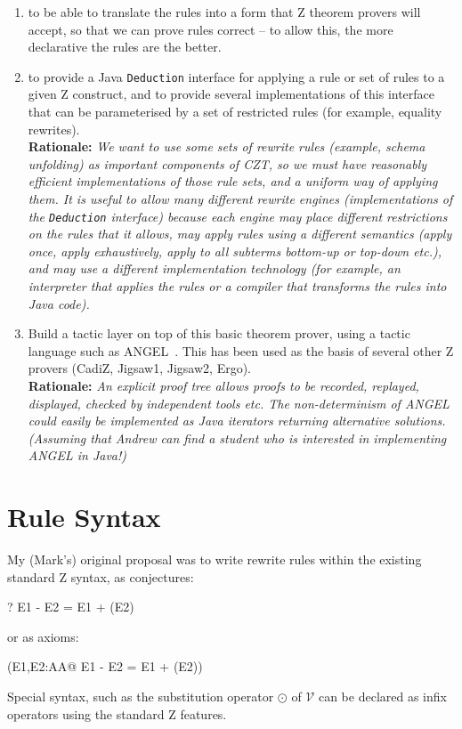 \documentclass{article}
\newenvironment{Rationale}{\\ \textbf{Rationale:}\it}{}
\newcommand{\negate}{\mathop{-}}
\newcommand{\arithmos}{{A\!\!\!\!A}}   %
\begin{document}
\begin{enumerate}
\item to be able to translate the rules into a form that Z theorem 
  provers will accept, so that we can prove rules correct -- to allow this,
  the more declarative the rules are the better.

\item to provide a Java \texttt{Deduction} interface for applying a rule or
  set of rules to a given Z construct, and to provide several
  implementations of this interface that can be parameterised by a set
  of restricted rules (for example, equality rewrites).
  \begin{Rationale} 
  We want to use some sets of rewrite rules
  (example, schema unfolding) as important components of CZT, so we
  must have reasonably efficient implementations of those rule sets,
  and a uniform way of applying them.  It is useful to allow many
  different rewrite engines (implementations of the \texttt{Deduction}
  interface) because each engine may place different restrictions on
  the rules that it allows, may apply rules using a different
  semantics (apply once, apply exhaustively, apply to all subterms
  bottom-up or top-down etc.), and may use a different implementation
  technology (for example, an interpreter that applies the rules or a
  compiler that transforms the rules into Java code).
  \end{Rationale}

\item Build a tactic layer on top of this basic theorem prover,
  using a tactic language such as
  ANGEL~\cite{martin:tactics}.  This has been used as the basis
  of several other Z provers (CadiZ, Jigsaw1, Jigsaw2, Ergo).
  \begin{Rationale}
    An explicit proof tree allows proofs to be recorded, replayed,
    displayed, checked by independent tools etc.
    The non-determinism of ANGEL could easily be implemented as
    Java iterators returning alternative solutions.
    (Assuming that Andrew can find a student who is interested 
    in implementing ANGEL in Java!)
  \end{Rationale}
\end{enumerate}


\section{Rule Syntax}

My (Mark's) original proposal was to write rewrite rules within the
existing standard Z syntax, as conjectures:
\begin{zed}
  \vdash? E1 - E2 = E1 + (\negate E2)
\end{zed}
or as axioms:
\begin{axdef}
\where
  (\forall E1,E2:\arithmos @ E1 - E2 = E1 + (\negate E2))
\end{axdef}
Special syntax, such as the substitution operator $\odot$ of $\mathcal{V}$
can be declared as infix operators using the standard Z features.
\end{document}

